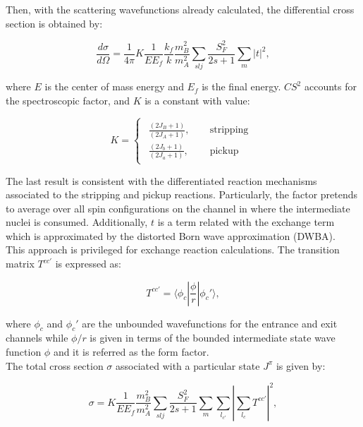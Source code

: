\documentclass[openany]{book}
\begin{document}
Then, with the scattering wavefunctions already calculated, the differential cross section is obtained by:

\begin{equation} \label{eq:exchange_differential}
	\frac{d\sigma}{d\Omega} = \frac{1}{4\pi} K \frac{1}{E E_f} \frac{k_f}{k}\frac{m^2_B}{m^2_A} \sum_{slj} { \frac{S^2_F}{2s + 1}\sum_{m} |t|^2},
\end{equation}

where $E$ is the center of mass energy and $E_f$ is the final energy.  $CS^2$ accounts for the spectroscopic factor, and $K$ is a constant with value:

\begin{equation} \label{eq:exchange_constant}
	K = 	\left\{\begin{array}{l}
		\begin{split}
			\frac{(2J_B + 1)}{(2J_A + 1)}, \quad &\mathrm{\ stripping} \\ 
			\frac{(2J_b + 1)}{(2J_a + 1)}, \quad &\mathrm{\ pickup}
		\end{split}
	\end{array}\right.
\end{equation}

The last result is consistent with the differentiated reaction mechanisms associated to the stripping and pickup reactions. Particularly, the factor pretends to average over all spin configurations on the channel in where the intermediate nuclei is consumed.  Additionally, $t$ is a term related with the exchange term which is approximated by the distorted Born wave approximation (DWBA). \\

This approach is privileged for exchange reaction calculations. The transition matrix $T^{cc'}$ is expressed as: 

\begin{equation}\label{eq:exchange_matrix}
	T^{cc'} = \langle  \phi_c | \frac{\phi}{r}|  \phi_c' \rangle,
\end{equation}

where $\phi_c $ and $\phi_c'$ are the unbounded wavefunctions for the entrance and exit channels while $\phi/r$ is given in terms of the bounded intermediate state wave function $\phi$ and it is referred as the form factor. \\

The total cross section $\sigma$ associated with a particular state $J^{\pi}$ is given by: 

\begin{equation} \label{eq:exchange_crossSection}
	\sigma = K \frac{1}{E E_f} \frac{m^2_B}{m^2_A} \sum_{slj} { \frac{S^2_F}{2s + 1}\sum_{m} \sum_{l_{c'}} \left|\sum_{l_{c}} T^{cc'}\right|^2},
\end{equation}
\end{document}
